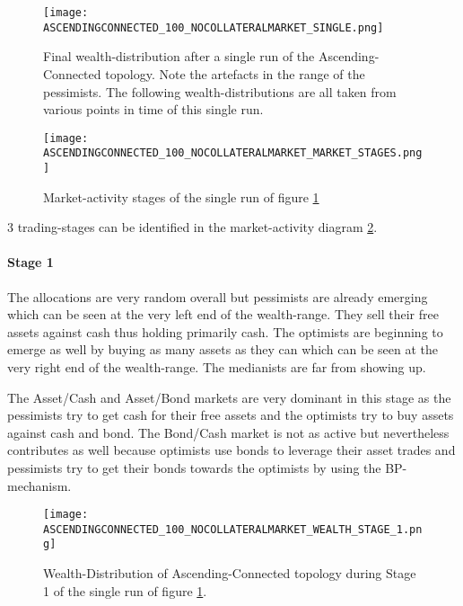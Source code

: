 \documentclass[Bachelorarbeit.tex]{subfiles}
\begin{document}
\medskip

\begin{figure}[H]
	\centering
  \texttt{[image: ASCENDINGCONNECTED\_100\_NOCOLLATERALMARKET\_SINGLE.png]}
	\caption{Final wealth-distribution after a single run of the Ascending-Connected topology. Note the artefacts in the range of the pessimists. The following wealth-distributions are all taken from various points in time of this single run.}
	\label{fig:wealth_ASCENDINGCONNECTED_100_NOCOLLATERALMARKET_SINGLE}
\end{figure}

\begin{figure}[H]
	\centering
  \texttt{[image: ASCENDINGCONNECTED\_100\_NOCOLLATERALMARKET\_MARKET\_STAGES.png]}
  	\caption{Market-activity stages of the single run of figure \ref{fig:wealth_ASCENDINGCONNECTED_100_NOCOLLATERALMARKET_SINGLE}}
	\label{fig:markets_ASCENDINGCONNECTED_100_NOCOLLATERALMARKET_MARKET_STAGES}
\end{figure}

3 trading-stages can be identified in the market-activity diagram \ref{fig:markets_ASCENDINGCONNECTED_100_NOCOLLATERALMARKET_MARKET_STAGES}.

\paragraph{Stage 1}
The allocations are very random overall but pessimists are already emerging which can be seen at the very left end of the wealth-range. They sell their free assets against cash thus holding primarily cash. The optimists are beginning to emerge as well by buying as many assets as they can which can be seen at the very right end of the wealth-range. The medianists are far from showing up.

\medskip

The Asset/Cash and Asset/Bond markets are very dominant in this stage as the pessimists try to get cash for their free assets and the optimists try to buy assets against cash and bond. The Bond/Cash market is not as active but nevertheless contributes as well because optimists use bonds to leverage their asset trades and pessimists try to get their bonds towards the optimists by using the BP-mechanism.

\begin{figure}[H]
	\centering
  \texttt{[image: ASCENDINGCONNECTED\_100\_NOCOLLATERALMARKET\_WEALTH\_STAGE\_1.png]}
  	\caption{Wealth-Distribution of Ascending-Connected topology during Stage 1 of the single run of figure \ref{fig:wealth_ASCENDINGCONNECTED_100_NOCOLLATERALMARKET_SINGLE}.}
	\label{fig:markets_ASCENDINGCONNECTED_100_NOCOLLATERALMARKET_WEALTH_STAGE_1}
\end{figure}
\end{document}
